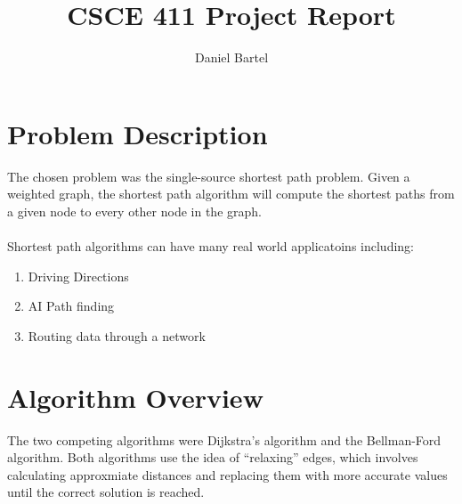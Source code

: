 \documentclass{article}
\title{CSCE 411 Project Report}
\author{Daniel Bartel}
\date{}
\begin{document}
  \maketitle
  \section*{Problem Description}
  The chosen problem was the single-source shortest path problem. Given a weighted graph, the shortest path algorithm will compute the shortest paths from a given node to every other node in the graph.
\\ \ \\
Shortest path algorithms can have many real world applicatoins including:
\begin{enumerate}
  \item[\textbullet] Driving Directions
  \item[\textbullet] AI Path finding
  \item[\textbullet] Routing data through a network
\end{enumerate}
  \section*{Algorithm Overview}
  The two competing algorithms were Dijkstra's algorithm and the Bellman-Ford algorithm. Both algorithms use the idea of ``relaxing'' edges, which involves calculating approxmiate distances and replacing them with more accurate values until the correct solution is reached.
\end{document}
